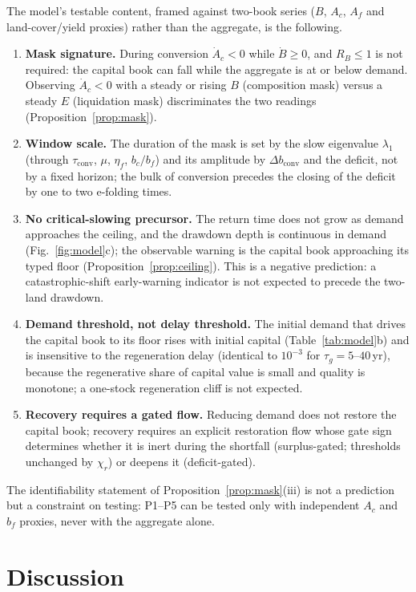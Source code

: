 \documentclass[preprint,12pt,authoryear]{elsarticle}
\newcommand{\dconv}{\Delta b_{\mathrm{conv}}}
\newcommand{\tconv}{\tau_{\mathrm{conv}}}
\begin{document}
The model's testable content, framed against two-book series ($B$, $A_c$, $A_f$ and land-cover/yield proxies) rather than the aggregate, is the following.
\begin{enumerate}[label=P\arabic*.,leftmargin=2.2em]
\item \textbf{Mask signature.} During conversion $\dot A_c<0$ while $\dot B\ge0$, and $R_B\le1$ is not required: the capital book can fall while the aggregate is at or below demand. Observing $\dot A_c<0$ with a steady or rising $B$ (composition mask) versus a steady $E$ (liquidation mask) discriminates the two readings (Proposition~\ref{prop:mask}).
\item \textbf{Window scale.} The duration of the mask is set by the slow eigenvalue $\lambda_1$ (through $\tconv$, $\mu$, $\eta_f$, $b_c/b_f$) and its amplitude by $\dconv$ and the deficit, not by a fixed horizon; the bulk of conversion precedes the closing of the deficit by one to two e-folding times.
\item \textbf{No critical-slowing precursor.} The return time does not grow as demand approaches the ceiling, and the drawdown depth is continuous in demand (Fig.~\ref{fig:model}c); the observable warning is the capital book approaching its typed floor (Proposition~\ref{prop:ceiling}). This is a negative prediction: a catastrophic-shift early-warning indicator is not expected to precede the two-land drawdown.
\item \textbf{Demand threshold, not delay threshold.} The initial demand that drives the capital book to its floor rises with initial capital (Table~\ref{tab:model}b) and is insensitive to the regeneration delay (identical to $10^{-3}$ for $\tau_g=5$--$40$\,yr), because the regenerative share of capital value is small and quality is monotone; a one-stock regeneration cliff is not expected.
\item \textbf{Recovery requires a gated flow.} Reducing demand does not restore the capital book; recovery requires an explicit restoration flow whose gate sign determines whether it is inert during the shortfall (surplus-gated; thresholds unchanged by $\chi_r$) or deepens it (deficit-gated).
\end{enumerate}
The identifiability statement of Proposition~\ref{prop:mask}(iii) is not a prediction but a constraint on testing: P1--P5 can be tested only with independent $A_c$ and $b_f$ proxies, never with the aggregate alone.

\section{Discussion}\label{sec:discussion}
\end{document}
